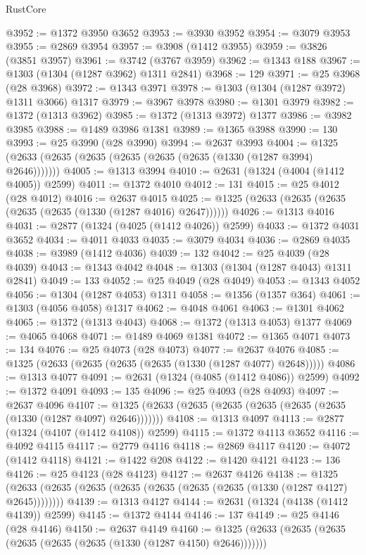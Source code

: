 \begin{lexlean}{RustCore}
\begin{coremodule}
@3952 := @1372 @3950 @3652
@3953 := @3930 @3952
@3954 := @3079 @3953
@3955 := @2869 @3954
@3957 := @3908 (@1412 @3955)
@3959 := @3826 (@3851 @3957)
@3961 := @3742 (@3767 @3959)
@3962 := @1343 @188
@3967 := @1303 (@1304 (@1287 @3962) @1311 @2841)
@3968 := 129
@3971 := @25 @3968 (@28 @3968)
@3972 := @1343 @3971
@3978 := @1303 (@1304 (@1287 @3972) @1311 @3066) @1317
@3979 := @3967 @3978
@3980 := @1301 @3979
@3982 := @1372 (@1313 @3962)
@3985 := @1372 (@1313 @3972) @1377
@3986 := @3982 @3985
@3988 := @1489 @3986 @1381
@3989 := @1365 @3988
@3990 := 130
@3993 := @25 @3990 (@28 @3990)
@3994 := @2637 @3993
@4004 := @1325 (@2633 (@2635 (@2635 (@2635 (@2635 (@2635 (@1330 (@1287 @3994) @2646)))))))
@4005 := @1313 @3994
@4010 := @2631 (@1324 (@4004 (@1412 @4005)) @2599)
@4011 := @1372 @4010
@4012 := 131
@4015 := @25 @4012 (@28 @4012)
@4016 := @2637 @4015
@4025 := @1325 (@2633 (@2635 (@2635 (@2635 (@2635 (@1330 (@1287 @4016) @2647))))))
@4026 := @1313 @4016
@4031 := @2877 (@1324 (@4025 (@1412 @4026)) @2599)
@4033 := @1372 @4031 @3652
@4034 := @4011 @4033
@4035 := @3079 @4034
@4036 := @2869 @4035
@4038 := @3989 (@1412 @4036)
@4039 := 132
@4042 := @25 @4039 (@28 @4039)
@4043 := @1343 @4042
@4048 := @1303 (@1304 (@1287 @4043) @1311 @2841)
@4049 := 133
@4052 := @25 @4049 (@28 @4049)
@4053 := @1343 @4052
@4056 := @1304 (@1287 @4053) @1311
@4058 := @1356 (@1357 @364)
@4061 := @1303 (@4056 @4058) @1317
@4062 := @4048 @4061
@4063 := @1301 @4062
@4065 := @1372 (@1313 @4043)
@4068 := @1372 (@1313 @4053) @1377
@4069 := @4065 @4068
@4071 := @1489 @4069 @1381
@4072 := @1365 @4071
@4073 := 134
@4076 := @25 @4073 (@28 @4073)
@4077 := @2637 @4076
@4085 := @1325 (@2633 (@2635 (@2635 (@2635 (@1330 (@1287 @4077) @2648)))))
@4086 := @1313 @4077
@4091 := @2631 (@1324 (@4085 (@1412 @4086)) @2599)
@4092 := @1372 @4091
@4093 := 135
@4096 := @25 @4093 (@28 @4093)
@4097 := @2637 @4096
@4107 := @1325 (@2633 (@2635 (@2635 (@2635 (@2635 (@2635 (@1330 (@1287 @4097) @2646)))))))
@4108 := @1313 @4097
@4113 := @2877 (@1324 (@4107 (@1412 @4108)) @2599)
@4115 := @1372 @4113 @3652
@4116 := @4092 @4115
@4117 := @2779 @4116
@4118 := @2869 @4117
@4120 := @4072 (@1412 @4118)
@4121 := @1422 @208
@4122 := @1420 @4121
@4123 := 136
@4126 := @25 @4123 (@28 @4123)
@4127 := @2637 @4126
@4138 := @1325 (@2633 (@2635 (@2635 (@2635 (@2635 (@2635 (@2635 (@1330 (@1287 @4127) @2645))))))))
@4139 := @1313 @4127
@4144 := @2631 (@1324 (@4138 (@1412 @4139)) @2599)
@4145 := @1372 @4144
@4146 := 137
@4149 := @25 @4146 (@28 @4146)
@4150 := @2637 @4149
@4160 := @1325 (@2633 (@2635 (@2635 (@2635 (@2635 (@2635 (@1330 (@1287 @4150) @2646)))))))

\end{coremodule}
\end{lexlean}
